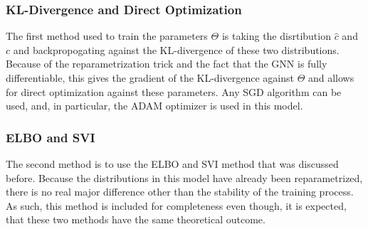 \subsubsection{KL-Divergence and Direct Optimization}
The first method used to train the parameters $\Theta$ is taking the disrtibution $\hat{c}$ and $c$ and backpropogating against the KL-divergence of these two distributions. Because of the reparametrization trick and the fact that the GNN is fully differentiable, this gives the gradient of the KL-divergence against $\Theta$ and allows for direct optimization against these parameters. Any SGD algorithm can be used, and, in particular, the ADAM optimizer \cite{kingma_adam_2017} is used in this model.

\subsubsection{ELBO and SVI}
The second method is to use the ELBO and SVI method that was discussed before. Because the distributions in this model have already been reparametrized, there is no real major difference other than the stability of the training process. As such, this method is included for completeness even though, it is expected, that these two methods have the same theoretical outcome.
\newpage
